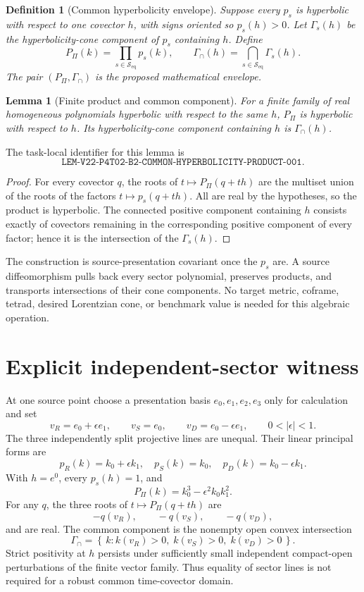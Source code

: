\documentclass[11pt]{article}
\newtheorem{definition}{Definition}
\newtheorem{lemma}{Lemma}
\newcommand{\Seq}{\mathcal S_{\mathrm{eq}}}
\newcommand{\GammaInt}{\Gamma_{\cap}}
\newcommand{\Pprod}{P_{\Pi}}
\begin{document}
\begin{definition}[Common hyperbolicity envelope]
Suppose every \(p_s\) is hyperbolic with respect to one covector \(h\), with
signs oriented so \(p_s(h)>0\).  Let \(\Gamma_s(h)\) be the hyperbolicity-cone
component of \(p_s\) containing \(h\).  Define
\[
 \Pprod(k)=\prod_{s\in\Seq}p_s(k),
 \qquad
 \GammaInt(h)=\bigcap_{s\in\Seq}\Gamma_s(h).
\]
The pair \((\Pprod,\GammaInt)\) is the proposed mathematical envelope.
\end{definition}

\begin{lemma}[Finite product and common component]
\label{lem:product}
For a finite family of real homogeneous polynomials hyperbolic with respect to
the same \(h\), \(\Pprod\) is hyperbolic with respect to \(h\).  Its
hyperbolicity-cone component containing \(h\) is \(\GammaInt(h)\).
\end{lemma}

The task-local identifier for this lemma is
\[
 \texttt{LEM-V22-P4T02-B2-COMMON-HYPERBOLICITY-PRODUCT-001}.
\]

\begin{proof}
For every covector \(q\), the roots of
\(t\mapsto \Pprod(q+t h)\) are the multiset union of the roots of the factors
\(t\mapsto p_s(q+t h)\).  All are real by the hypotheses, so the product is
hyperbolic.  The connected positive component containing \(h\) consists
exactly of covectors remaining in the corresponding positive component of
every factor; hence it is the intersection of the \(\Gamma_s(h)\).
\end{proof}

The construction is source-presentation covariant once the \(p_s\) are.  A
source diffeomorphism pulls back every sector polynomial, preserves products,
and transports intersections of their cone components.  No target metric,
coframe, tetrad, desired Lorentzian cone, or benchmark value is needed for
this algebraic operation.

\section{Explicit independent-sector witness}

At one source point choose a presentation basis \(e_0,e_1,e_2,e_3\) only for
calculation and set
\[
 v_R=e_0+\epsilon e_1,\qquad
 v_S=e_0,\qquad
 v_D=e_0-\epsilon e_1,
 \qquad 0<|\epsilon|<1.
\]
The three independently split projective lines are unequal.  Their linear
principal forms are
\[
 p_R(k)=k_0+\epsilon k_1,\quad
 p_S(k)=k_0,\quad
 p_D(k)=k_0-\epsilon k_1.
\]
With \(h=e^0\), every \(p_s(h)=1\), and
\[
 \Pprod(k)=k_0^3-\epsilon^2 k_0k_1^2.
\]
For any \(q\), the three roots of
\(t\mapsto\Pprod(q+t h)\) are
\[
 -q(v_R),\qquad -q(v_S),\qquad -q(v_D),
\]
and are real.  The common component is the nonempty open convex intersection
\[
 \GammaInt=\left\{\,k : k(v_R)>0,\;k(v_S)>0,\;k(v_D)>0\,\right\}.
\]
Strict positivity at \(h\) persists under sufficiently small independent
compact-open perturbations of the finite vector family.  Thus equality of
sector lines is not required for a robust common time-covector domain.
\end{document}

